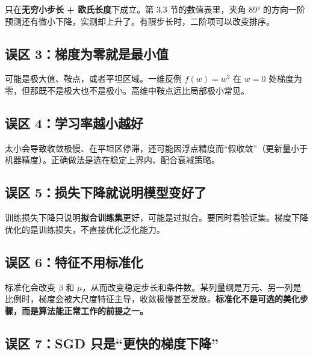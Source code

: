 \documentclass[UTF8, a4paper, zihao=-4, fontset=none]{ctexart}
\begin{document}
只在\textbf{无穷小步长 + 欧氏长度}下成立。第 3.3 节的数值表里，夹角 89° 的方向一阶预测还有微小下降，实测却上升了。有限步长时，二阶项可以改变排序。




\subsection*{误区 3：梯度为零就是最小值}



可能是极大值、鞍点，或者平坦区域。一维反例 $f(w)=w^3$ 在 $w=0$ 处梯度为零，但那既不是极大也不是极小。高维中鞍点远比局部极小常见。




\subsection*{误区 4：学习率越小越好}



太小会导致收敛极慢、在平坦区停滞，还可能因浮点精度而“假收敛”（更新量小于机器精度）。正确做法是选在稳定上界内、配合衰减策略。




\subsection*{误区 5：损失下降就说明模型变好了}



训练损失下降只说明\textbf{拟合训练集}更好，可能是过拟合。要同时看验证集。梯度下降优化的是训练损失，不直接优化泛化能力。




\subsection*{误区 6：特征不用标准化}



标准化会改变 $\beta$ 和 $\mu$，从而改变稳定步长和条件数。某列量纲是万元、另一列是比例时，梯度会被大尺度特征主导，收敛极慢甚至发散。\textbf{标准化不是可选的美化步骤，而是算法能正常工作的前提之一。}




\subsection*{误区 7：SGD 只是“更快的梯度下降”}
\end{document}
